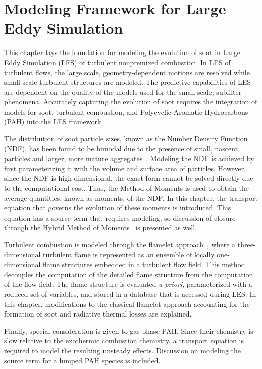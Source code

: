 \chapter{Modeling Framework for Large Eddy Simulation\label{ch:lesmodels}}

This chapter lays the foundation for modeling the evolution of soot in Large Eddy Simulation (LES) of turbulent nonpremixed combustion. In LES of turbulent flows, the large scale, geometry-dependent motions are resolved while small-scale turbulent structures are modeled. The predictive capabilities of LES are dependent on the quality of the models used for the small-scale, subfilter phenomena. Accurately capturing the evolution of soot requires the integration of models for soot, turbulent combustion, and Polycyclic Aromatic Hydrocarbons (PAH) into the LES framework.

The distribution of soot particle sizes, known as the Number Density Function (NDF), has been found to be bimodal due to the presence of small, nascent particles and larger, more mature aggregates~\cite{zhao2003,zhao2005,netzell2007}. Modeling the NDF is achieved by first parameterizing it with the volume and surface area of particles. However, since the NDF is high-dimensional, the exact form cannot be solved directly due to the computational cost. Thus, the Method of Moments is used to obtain the average quantities, known as moments, of the NDF. In this chapter, the transport equation that governs the evolution of these moments is introduced. This equation has a source term that requires modeling, so discussion of closure through the Hybrid Method of Moments~\cite{hmom2009} is presented as well.

Turbulent combustion is modeled through the flamelet approach~\cite{peters1984}, where a three-dimensional turbulent flame is represented as an ensemble of locally one-dimensional flame structures embedded in a turbulent flow field. This method decouples the computation of the detailed flame structure from the computation of the flow field. The flame structure is evaluated \textit{a priori}, parameterized with a reduced set of variables, and stored in a database that is accessed during LES. In this chapter, modifications to the classical flamelet approach accounting for the formation of soot and radiative thermal losses are explained. %

Finally, special consideration is given to gas-phase PAH. Since their chemistry is slow relative to the exothermic combustion chemistry, a transport equation is required to model the resulting unsteady effects. Discussion on modeling the source term for a lumped PAH species is included.

